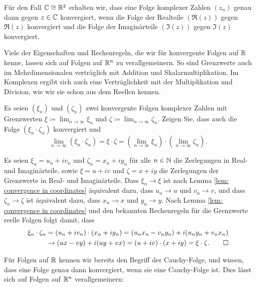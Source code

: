 \documentclass[a4paper,10pt]{article}
\begin{document}
\begin{bem}
 Für den Fall $\mathbb{C} \cong \mathbb{R}^2$ erhalten wir, dass eine Folge komplexer Zahlen $(z_n)$ genau dann gegen $z \in \mathbb{C}$ konvergiert, wenn die Folge der Realteile $(\Re(z))$ gegen $\Re(z)$ konvergiert und die Folge der Imaginärteile $(\Im(z))$ gegen $\Im(z)$ konvergiert.
\end{bem}


Viele der Eigenschaften und Rechenregeln, die wir für konvergente Folgen auf $\mathbb{R}$ kenne, lassen sich auf Folgen auf $\mathbb{R}^n$ zu verallgemeinern. So sind Grenzwerte auch im Mehrdimensionalen verträglich mit Addition und Skalarmultiplikation. Im Komplexen ergibt sich auch eine Verträglichkeit mit der Multiplikation und Division, wie wir sie schon aus dem Reellen kennen.


\begin{question}
 Es seien $(\xi_n)$ und $(\zeta_n)$ zwei konvergente Folgen komplexer Zahlen mit Grenzwerten $\xi \coloneqq \lim_{n \to \infty} \xi_n$ und $\zeta \coloneqq \lim_{n \to \infty} \zeta_n$. Zeigen Sie, dass auch die Folge $(\xi_n \cdot \zeta_n)$ konvergiert und
 \[
  \lim_{n \to \infty} (\xi_n \cdot \zeta_n)
  = \xi \cdot \zeta
  = \left( \lim_{n \to \infty} \xi_n \right) \cdot \left( \lim_{n \to \infty} \zeta_n \right).
 \]
\end{question}
\begin{solution}
 Es seien $\xi_n = u_n + i v_n$ und $\zeta_n = x_n + i y_n$ für alle $n \in \mathbb{N}$ die Zerlegungen in Real- und Imaginärteile, sowie $\xi = u + i v$ und $\zeta = x + i y$ die Zerlegungen der Grenzwerte in Real- und Imaginärteile. Dass $\xi_n \to \xi$ ist nach Lemma \ref{lem: convergence in coordinates} äquivalent dazu, dass $u_n \to u$ und $v_n \to v$, und dass $\zeta_n \to \zeta$ ist äquivalent dazu, dass $x_n \to x$ und $y_n \to y$. Nach Lemma \ref{lem: convergence in coordinates} und den bekannten Rechenregeln für die Grenzwerte reelle Folgen folgt damit, dass
 \begin{align*}
  \xi_n \cdot \zeta_n
  &= (u_n + i v_n) \cdot (x_n + i y_n)
  = (u_n x_n - v_n y_n) + i (u_n y_n + v_n x_n) \\
  &\to (ux - vy) + i(uy + vx)
  = (u + iv) \cdot (x + iy)
  = \xi \cdot \zeta.
  \qedhere
 \end{align*}
\end{solution}


Für Folgen auf $\mathbb{R}$ kennen wir bereits den Begriff der Cauchy-Folge, und wissen, dass eine Folge genau dann konvergiert, wenn sie eine Cauchy-Folge ist. Dies lässt sich auf Folgen auf $\mathbb{R}^n$ verallgemeinern:
\end{document}

